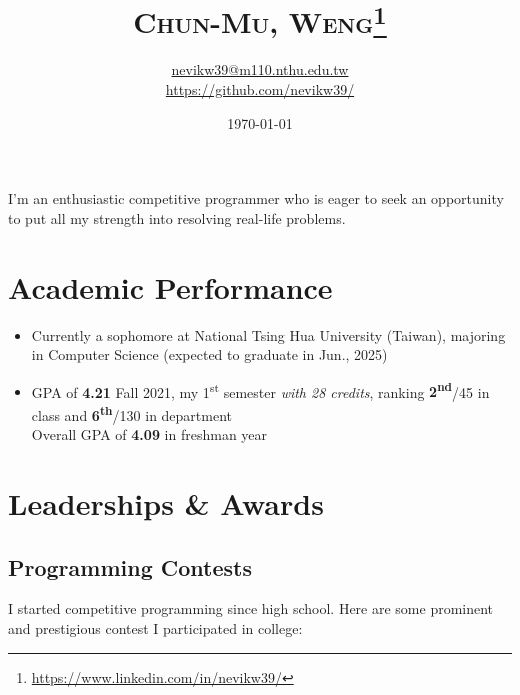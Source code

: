\documentclass[12pt, a4paper]{article}
\title{\textsc{Chun-Mu, Weng}\footnote{\url{https://www.linkedin.com/in/nevikw39/}}}%
\author{\href{mailto:nevikw39@m110.nthu.edu.tw}{\ttfamily nevikw39@m110.nthu.edu.tw}\\\url{https://github.com/nevikw39/}}
\date{\today}
\begin{document}
\maketitle

I'm an enthusiastic competitive programmer who is eager to seek an opportunity to put all my strength into resolving real-life problems.

\section{Academic Performance}

%

\begin{itemize}
\item Currently a sophomore at National Tsing Hua University (Taiwan), majoring in \textsf{Computer Science} (expected to graduate in Jun., 2025)
\item GPA of \textbf{4.21} Fall 2021, my 1\textsuperscript{st} semester \emph{with 28 credits}, ranking \textbf{2\textsuperscript{nd}}/45 in class and \textbf{6\textsuperscript{th}}/130 in department\\
Overall GPA of \textbf{4.09} in freshman year
\end{itemize}

\section{Leaderships \& Awards}

\subsection{Programming Contests}


I started competitive programming since high school. Here are some prominent and prestigious contest I participated in college:
\end{document}
